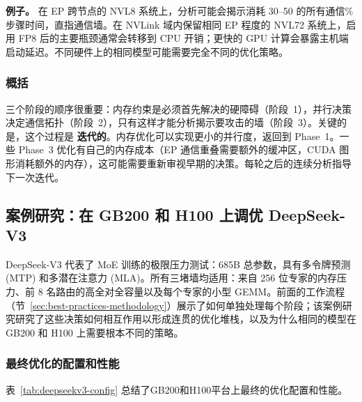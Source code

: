 \documentclass[10pt,logo,copyright]{nvidiatechreport_zh}
\begin{document}
\noindent\textbf{例子。} 在 EP 跨节点的 NVL8 系统上，分析可能会揭示消耗 30--50 的所有通信\% 步骤时间，直指通信墙。在 NVLink 域内保留相同 EP 程度的 NVL72 系统上，启用 FP8 后的主要瓶颈通常会转移到 CPU 开销；更快的 GPU 计算会暴露主机端启动延迟。不同硬件上的相同模型可能需要完全不同的优化策略。

\subsubsection{概括}

三个阶段的顺序很重要：内存约束是必须首先解决的硬障碍（阶段~1），并行决策决定通信拓扑（阶段~2），只有这样才能分析揭示要攻击的墙（阶段~3）。关键的是，这个过程是 \textbf{迭代的}。内存优化可以实现更小的并行度，返回到 Phase~1。一些 Phase~3 优化有自己的内存成本（EP 通信重叠需要额外的缓冲区，CUDA 图形消耗额外的内存），这可能需要重新审视早期的决策。每轮之后的连续分析指导下一次迭代。

\subsection{案例研究：在 GB200 和 H100 上调优 DeepSeek-V3}\label{sec:deepseek-case-study}

DeepSeek-V3 代表了 MoE 训练的极限压力测试：685B 总参数，具有多令牌预测 (MTP) 和多潜在注意力 (MLA)。所有三堵墙均适用：来自 256 位专家的内存压力、前 8 名路由的高全对全容量以及每个专家的小型 GEMM。前面的工作流程（节~\ref{sec:best-practices-methodology}）展示了如何单独处理每个阶段；该案例研究研究了这些决策如何相互作用以形成连贯的优化堆栈，以及为什么相同的模型在 GB200 和 H100 上需要根本不同的策略。

\subsubsection{最终优化的配置和性能}

表~\ref{tab:deepseekv3-config} 总结了GB200和H100平台上最终的优化配置和性能。
\end{document}
